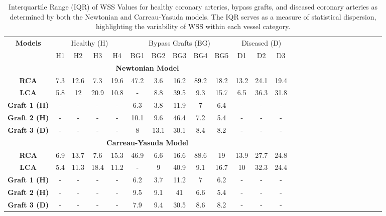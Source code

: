 ﻿\documentclass[12pt,a4paper]{article}
\theoremstyle{definition}
\numberwithin{equation}{section}
\begin{document}
\begin{table}[h!]
\centering
    \setlength{\tabcolsep}{5pt}
    \renewcommand{\arraystretch}{0.9}
    \caption{Interquartile Range (IQR) of WSS Values for healthy coronary arteries, bypass grafts, and diseased coronary arteries as determined by both the Newtonian and Carreau-Yasuda models. The IQR serves as a measure of statistical dispersion, highlighting the variability of WSS within each vessel category.}
    \begin{tabular}{|c|c|c|c|c|c|c|c|c|c|c|c|c|c|c|c|c|c|c|c|c|c|c|c|c|c|} 
    \hline 
    \multirow{2}{*}{\textbf{Models}} & \multicolumn{4}{c|}{Healthy (H)} & \multicolumn{5}{c|}{Bypass Grafts (BG)} &\multicolumn{3}{c|}{Diseased (D)} \\ \cline{2-13}& H1 & H2 & H3 & H4 & BG1 & BG2 & BG3 & BG4 & BG5 & D1 & D2 & D3 \\ \hline
    \multicolumn{13}{|c|}{\textbf{Newtonian Model}}\\ \hline  \textbf{RCA}& 7.3 & 12.6 & 7.3 & 19.6& 47.2 & 3.6 & 16.2 & 89.2 & 18.2 &13.2 & 24.1 &19.4  \\ \hline  \textbf{LCA}& 5.8 & 12 & 20.9 & 10.8& - &8.8 & 39.5 & 9.3 & 15.7 & 6.5 &36.3& 31.8  \\ \hline 
   \textbf{Graft 1 (H)}& - & - & - & -& 6.3 & 3.8 & 11.9 & 7 & 6.4 & - &-& -  \\ \hline 
   \textbf{Graft 2 (H)}& - & - & - & -& 10.1 & 9.6 & 46.4 & 7.2 & 5.4 & - &-& - \\ \hline 
   \textbf{Graft 3 (D)}& - & - & - & -& 8 & 13.1 & 30.1 & 8.4 & 8.2 & - &-& - \\ \hline
    \multicolumn{13}{|c|}{\textbf{Carreau-Yasuda Model}}\\ \hline  \textbf{RCA}& 6.9 & 13.7 & 7.6 & 15.3& 46.9& 6.6 & 16.6 & 88.6 & 19 &13.9 & 27.7 &24.8  \\ \hline  \textbf{LCA}& 5.4 & 11.3 & 18.4 & 11.2& - &9 & 40.9 & 9.1 & 16.7 & 10 &32.3& 24.4  \\ \hline 
   \textbf{Graft 1 (H)}& - & - & - & -& 6.2 & 3.7 & 11.2 & 7 & 6.2 & - &-& -  \\ \hline 
   \textbf{Graft 2 (H)}& - & - & - & -& 9.5 & 9.1 & 41 & 6.6 & 5.4 & - &-& - \\ \hline 
   \textbf{Graft 3 (D)}& - & - & - & -& 7.9 & 9.4 & 30.5 & 8.6 & 8.2 & - &-& - \\ \hline
    \end{tabular}
    \label{tab:f}
\end{table}
\end{document}
